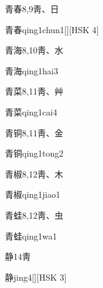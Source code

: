 \begin{entry}{青春}{8,9}{⾭、⽇}
  \begin{phonetics}{青春}{qing1chun1}[][HSK 4]
  \end{phonetics}
\end{entry}

\begin{entry}{青海}{8,10}{⾭、⽔}
  \begin{phonetics}{青海}{qing1hai3}
  \end{phonetics}
\end{entry}

\begin{entry}{青菜}{8,11}{⾭、⾋}
  \begin{phonetics}{青菜}{qing1cai4}
  \end{phonetics}
\end{entry}

\begin{entry}{青铜}{8,11}{⾭、⾦}
  \begin{phonetics}{青铜}{qing1tong2}
  \end{phonetics}
\end{entry}

\begin{entry}{青椒}{8,12}{⾭、⽊}
  \begin{phonetics}{青椒}{qing1jiao1}
  \end{phonetics}
\end{entry}

\begin{entry}{青蛙}{8,12}{⾭、⾍}
  \begin{phonetics}{青蛙}{qing1wa1}
  \end{phonetics}
\end{entry}

\begin{entry}{静}{14}{⾭}
  \begin{phonetics}{静}{jing4}[][HSK 3]
  \end{phonetics}
\end{entry}


